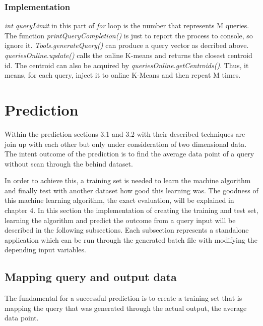 \documentclass{lmproj}
\begin{document}
\subsubsection{Implementation}


\textit{int queryLimit} in this part of \textit{for} loop is the number that represents M queries. The function \textit{printQueryCompletion()} is just to report the process to console, so ignore it. \textit{Tools.generateQuery()} can produce a query vector as decribed above. \textit{queriesOnline.update()} calls the online K-means and returns the closest centroid id. The centroid can also be acquired by \textit{queriesOnline.getCentroids()}. Thus, it means, for each query, inject it to online K-Means and then repeat M times. 


\clearpage
\section{Prediction}
Within the prediction sections 3.1 and 3.2 with their described techniques are join up with each other but only under consideration of two dimensional data. The intent outcome of the prediction is to find the average data point of a query without scan through the behind dataset. 

In order to achieve this, a training set is needed to learn the machine algorithm and finally test with another dataset how good this learning was. The goodness of this machine learning algorithm, the exact evaluation, will be explained in chapter 4. In this section the implementation of creating the training and test set, learning the algorithm and predict the outcome from a query input will be described in the following subsections. Each subsection represents a standalone application which can be run through the generated batch file with modifying the depending input variables. 

\subsection{Mapping query and output data}

The fundamental for a successful prediction is to create a training set that is mapping the query that was generated through the actual output, the average data point.
\end{document}
